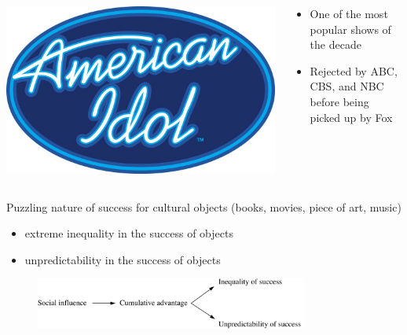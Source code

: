 \documentclass[aspectratio=169]{beamer}
\begin{document}
\begin{frame}

  \begin{columns}
     \begin{block}{}
       \includegraphics[width=\textwidth]{figures/american-idol}
     \end{block}

     \begin{block}{}
       \begin{itemize}
         \item One of the most popular shows of the decade
         \item Rejected by ABC, CBS, and NBC before being picked up by Fox
       \end{itemize}
     \end{block}
  \end{columns}

\end{frame}
\begin{frame}

Puzzling nature of success for cultural objects (books, movies, piece of art, music)
\begin{itemize}
  \item<1-> {extreme inequality in the success of objects}
  \item <2->{unpredictability in the success of objects}
\end{itemize}

\end{frame}
\begin{frame} 

\begin{figure}
  \includegraphics[width = 0.8\textwidth]{figures/musiclab_model}
\end{figure}

\end{frame}
\end{document}
